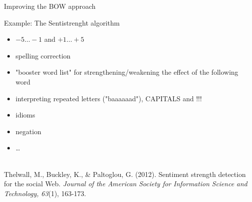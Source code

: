 \documentclass{beamer}
\begin{document}
\begin{frame}{Improving the BOW approach}
\begin{block}{Example: The Sentistrenght algorithm}
\begin{itemize}
\item $-5\ldots-1$ and $+1\ldots+5$
\item spelling correction
\item "booster word list" for strengthening/weakening the effect of the following word
\item interpreting repeated letters ("baaaaaad"), CAPITALS and !!!
\item idioms
\item negation 
\item \ldots
\end{itemize}
\end{block}
~ \\
\tiny{Thelwall, M., Buckley, K., \& Paltoglou, G. (2012). Sentiment strength detection for the social Web. \emph{Journal of the American Society for Information Science and Technology, 63}(1), 163-173.\\}
\end{frame}
\end{document}
